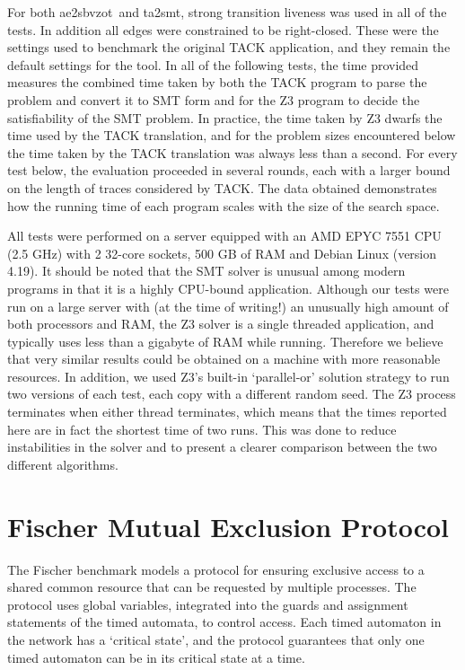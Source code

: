 \documentclass[a4paper,11pt]{report}
\theoremstyle{definition}
\newcommand{\aez}{ae2sbvzot}
\begin{document}
For both \aez\ and ta2smt, strong transition liveness was used in all of the
tests. In addition all edges were constrained to be right-closed. These were the
settings used to benchmark the original TACK application, and they remain the
default settings for the tool. In all of the following tests, the time provided
measures the combined time taken by both the TACK program to parse the problem
and convert it to SMT form and for the Z3 program to decide the satisfiability
of the SMT problem. In practice, the time taken by Z3 dwarfs the time used by
the TACK translation, and for the problem sizes encountered below the time taken
by the TACK translation was always less than a second. For every test below, the
evaluation proceeded in several rounds, each with a larger bound on the length
of traces considered by TACK\@. The data obtained demonstrates how the running
time of each program scales with the size of the search space.

All tests were performed on a server equipped with an AMD EPYC 7551 CPU (2.5
GHz) with 2 32-core sockets, 500 GB of RAM and Debian Linux (version 4.19). It
should be noted that the SMT solver is unusual among modern programs in that it
is a highly CPU-bound application. Although our tests were run on a large server
with (at the time of writing!) an unusually high amount of both processors and
RAM, the Z3 solver is a single threaded application, and typically uses less
than a gigabyte of RAM while running. Therefore we believe that very similar
results could be obtained on a machine with more reasonable resources. In
addition, we used Z3's built-in `parallel-or' solution strategy to run two
versions of each test, each copy with a different random seed. The Z3 process
terminates when either thread terminates, which means that the times reported
here are in fact the shortest time of two runs. This was done to reduce
instabilities in the solver and to present a clearer comparison between the two
different algorithms.



\section{Fischer Mutual Exclusion Protocol}\label{evaluation-fischer}
The Fischer benchmark models a protocol for ensuring exclusive access to a
shared common resource that can be requested by multiple processes. The protocol
uses global variables, integrated into the guards and assignment statements of
the timed automata, to control access. Each timed automaton in the network has a
`critical state', and the protocol guarantees that only one timed automaton can
be in its critical state at a time.
\end{document}
